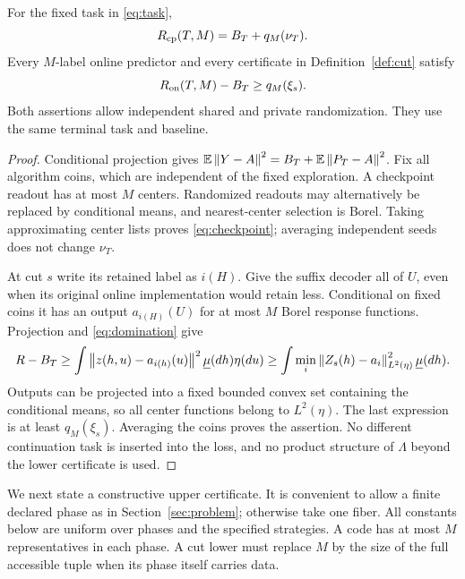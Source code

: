 \begin{lemma}\label{lem:cut}
For the fixed task in \eqref{eq:task},
\begin{equation}\label{eq:checkpoint}
 R_{\mathrm{cp}}(T,M)=B_T+q_M(\nu_T).
\end{equation}
Every $M$-label online predictor and every certificate in Definition~\ref{def:cut} satisfy
\begin{equation}\label{eq:cutlower}
 R_{\mathrm{on}}(T,M)-B_T\ge q_M(\xi_s).
\end{equation}
Both assertions allow independent shared and private randomization. They use the same terminal task and baseline.
\end{lemma}
\begin{proof}
Conditional projection gives $\mathbb E\left\lVert Y-A\right\rVert^2=B_T+\mathbb E\left\lVert P_T-A\right\rVert^2$. Fix all algorithm coins, which are independent of the fixed exploration. A checkpoint readout has at most $M$ centers. Randomized readouts may alternatively be replaced by conditional means, and nearest-center selection is Borel. Taking approximating center lists proves \eqref{eq:checkpoint}; averaging independent seeds does not change $\nu_T$.

At cut $s$ write its retained label as $i(H)$. Give the suffix decoder all of $U$, even when its original online implementation would retain less. Conditional on fixed coins it has an output $a_{i(H)}(U)$ for at most $M$ Borel response functions. Projection and \eqref{eq:domination} give
\[
 R-B_T\ge\int\left\lVert z(h,u)-a_{i(h)}(u)\right\rVert^2
                   \underline\mu(dh)\eta(du)
 \ge\int\min_i\left\lVert Z_s(h)-a_i\right\rVert_{L^2(\eta)}^2\underline\mu(dh).
\]
Outputs can be projected into a fixed bounded convex set containing the conditional means, so all center functions belong to $L^2(\eta)$. The last expression is at least $q_M(\xi_s)$. Averaging the coins proves the assertion. No different continuation task is inserted into the loss, and no product structure of $\Lambda$ beyond the lower certificate is used.
\end{proof}

We next state a constructive upper certificate. It is convenient to allow a finite declared phase as in Section~\ref{sec:problem}; otherwise take one fiber. All constants below are uniform over phases and the specified strategies. A code has at most $M$ representatives in each phase. A cut lower must replace $M$ by the size of the full accessible tuple when its phase itself carries data.

